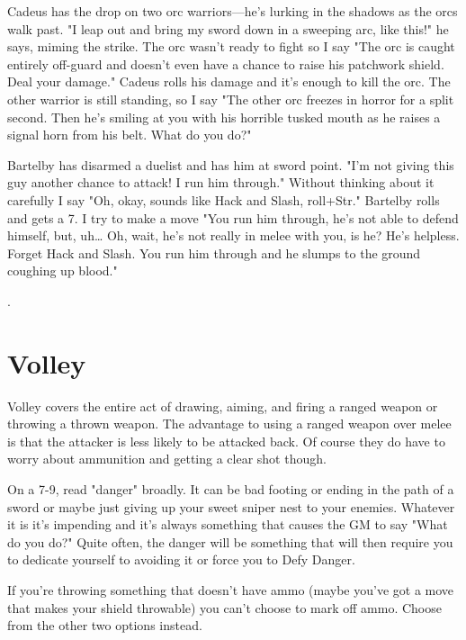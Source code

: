 \startExample
Cadeus has the drop on two orc warriors—he's lurking in the shadows as the orcs walk past. "I leap out and bring my sword down in a sweeping arc, like this!" he says, miming the strike. The orc wasn't ready to fight so I say "The orc is caught entirely off-guard and doesn't even have a chance to raise his patchwork shield. Deal your damage." Cadeus rolls his damage and it's enough to kill the orc. The other warrior is still standing, so I say "The other orc freezes in horror for a split second. Then he's smiling at you with his horrible tusked mouth as he raises a signal horn from his belt. What do you do?"
\stopExample
       
\startExample
Bartelby has disarmed a duelist and has him at sword point. "I'm not giving this guy another chance to attack! I run him through." Without thinking about it carefully I say "Oh, okay, sounds like Hack and Slash, roll+Str." Bartelby rolls and gets a 7. I try to make a move "You run him through, he's not able to defend himself, but, uh… Oh, wait, he's not really in melee with you, is he? He's helpless. Forget Hack and Slash. You run him through and he slumps to the ground coughing up blood."
\stopExample

.
       
\section{Volley}  

 
       

Volley covers the entire act of drawing, aiming, and firing a ranged weapon or throwing a thrown weapon. The advantage to using a ranged weapon over melee is that the attacker is less likely to be attacked back. Of course they do have to worry about ammunition and getting a clear shot though.

       

On a 7-9, read "danger" broadly. It can be bad footing or ending in the path of a sword or maybe just giving up your sweet sniper nest to your enemies. Whatever it is it's impending and it's always something that causes the GM to say "What do you do?" Quite often, the danger will be something that will then require you to dedicate yourself to avoiding it or force you to Defy Danger.

       

If you're throwing something that doesn't have ammo (maybe you've got a move that makes your shield throwable) you can't choose to mark off ammo. Choose from the other two options instead.

